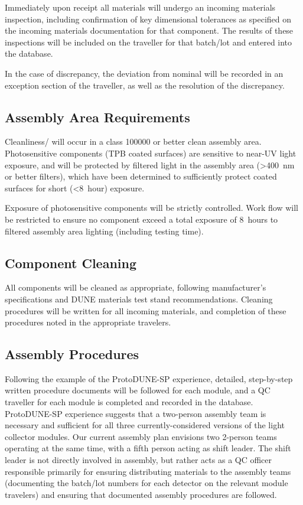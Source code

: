 Immediately upon receipt all materials will undergo an incoming materials inspection, including confirmation of key dimensional tolerances as specified on the incoming materials documentation for that component.  The results of these inspections will be included on the traveller for that batch/lot and entered into the database.

In the case of discrepancy, the deviation from nominal will be recorded in an exception section of the traveller, as well as the resolution of the discrepancy.

\subsection{Assembly Area Requirements}

Cleanliness/ will occur in a class \num{100000} or better clean assembly area.  Photosensitive components (TPB coated surfaces) are sensitive to near-UV light exposure, and will be protected by filtered light in the assembly area (>\SI{400}{nm} or better filters), which have been determined to sufficiently protect coated surfaces for short (<\SI{8}{hour}) exposure.

Exposure of photosensitive components will be strictly controlled.  Work flow will be restricted to ensure no component exceed a total exposure of \SI{8}{hours} to filtered assembly area lighting (including testing time).

\subsection{Component Cleaning}

All components will be cleaned  as appropriate, following manufacturer's specifications and DUNE materials test stand recommendations.  Cleaning procedures will be written for all incoming materials, and completion of these procedures noted in the appropriate travelers.

\subsection{Assembly Procedures}

Following the example of the ProtoDUNE-SP experience, detailed, step-by-step written procedure documents will be followed for each module, and a QC traveller for each module is completed and recorded in the database.  ProtoDUNE-SP experience suggests that a two-person assembly team is necessary and sufficient for all three currently-considered versions of the light collector modules.  Our current assembly plan envisions two 2-person teams operating at the same time, with a fifth person acting as shift leader.  The shift leader is not directly involved in assembly, but rather acts as a QC officer responsible primarily for ensuring distributing materials to the assembly teams (documenting the batch/lot numbers for each detector on the relevant module travelers) and ensuring that documented assembly procedures are followed.

